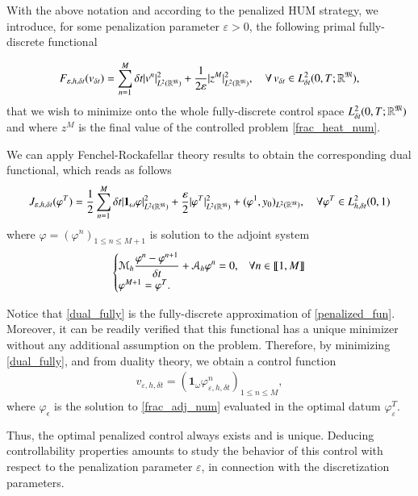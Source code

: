With the above notation and according to the penalized HUM strategy, we introduce, for some penalization parameter $\varepsilon>0$, the following primal fully-discrete functional 

\begin{align*}
F_{\varepsilon,h,\delta t}(v_{\delta t})=\sum_{n=1}^{M}\delta t |v^n|^2_{L^2(\mathbb{R}^{\mathfrak{M}})}+\frac{1}{2\varepsilon}|z^M|^2_{L^2(\mathbb{R}^{\mathfrak{M}})}, \quad \forall \, v_{\delta t}\in L_{\delta t}^2(0,T;\mathbb R^{\mathfrak{M}}),
\end{align*}
%
that we wish to minimize onto the whole fully-discrete control space $L_{\delta t}^2(0,T;\mathbb R^{\mathfrak{M}})$ and where $z^M$ is the final value of the controlled problem \eqref{frac_heat_num}. 

We can apply Fenchel-Rockafellar theory results to obtain the corresponding dual functional, which reads as follows
%
\begin{align}\label{dual_fully}
	J_{\varepsilon,h,\delta t}(\varphi^T)=\frac{1}{2}\sum_{n=1}^{M}\delta t|\mathbf 1_\omega\varphi|^2_{L^2(\mathbb{R}^{\mathfrak{M}})}+\frac{\varepsilon}{2}|\varphi^T|^2_{L^2(\mathbb{R}^{\mathfrak{M}})}+(\varphi^1,y_0)_{L^2(\mathbb{R}^{\mathfrak{M}})}, \quad \forall \varphi^T\in L_{h,\delta t}^2(0,1)
\end{align}
%
where $\varphi=(\varphi^n)_{1\leq n\leq M+1}$ is solution to the adjoint system
%
\begin{align}\label{frac_adj_num}
	\begin{cases}
		\displaystyle\mathcal M_h \frac{\varphi^n-\varphi^{n+1}}{\delta t}+\mathcal A_h \varphi^n=0, & \forall n\in\llbracket 1,M\rrbracket
		\\
		\varphi^{M+1}=\varphi^T. 
	\end{cases}
\end{align}

Notice that \eqref{dual_fully} is the fully-discrete approximation of \eqref{penalized_fun}. Moreover, it can be readily verified that this functional has a unique minimizer without any additional assumption on the problem. Therefore, by minimizing  \eqref{dual_fully}, and from duality theory, we obtain a control function 
\begin{align*}
	v_{\varepsilon,h,\delta t}=\left(\mathbf{1}_\omega\varphi_{\varepsilon,h,\delta t}^n\right)_{1\leq n\leq M},
\end{align*}
where $\varphi_\epsilon$ is the solution to \eqref{frac_adj_num} evaluated in the optimal datum $\varphi_\varepsilon^T$. 

Thus, the optimal penalized control always exists and is unique. Deducing controllability properties amounts to study the behavior of this control with respect to the penalization parameter $\varepsilon$, in connection with the discretization parameters.  

